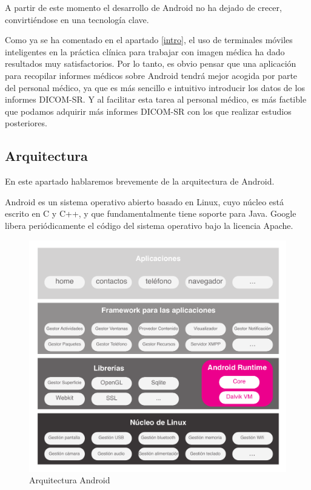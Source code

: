 A partir de este momento el desarrollo de Android no ha dejado de crecer, convirtiéndose en una tecnología clave.\par
Como ya se ha comentado en el apartado \ref{intro}, el uso de terminales móviles inteligentes en la práctica clínica para trabajar con imagen médica ha dado resultados muy satisfactorios. Por lo tanto, es obvio pensar que una aplicación para recopilar informes médicos sobre Android tendrá mejor acogida por parte del personal médico, ya que es más sencillo e intuitivo introducir los datos de los informes DICOM-SR. Y al facilitar esta tarea al personal médico, es más factible que podamos adquirir más informes DICOM-SR con los que realizar estudios posteriores.\par 

\subsection{Arquitectura}
En este apartado hablaremos brevemente de la arquitectura de Android.\par
Android es un sistema operativo abierto basado en Linux, cuyo núcleo está escrito en C y C++, y que fundamentalmente tiene soporte para Java. Google libera periódicamente el código del sistema operativo bajo la licencia Apache.\par 
\begin{figure}[ht]
\centering
\includegraphics[scale=0.8]{./imgs/esquemas/arquitectura.pdf}
\caption{Arquitectura Android}
\label{fig:arquitectura_android}
\end{figure}

